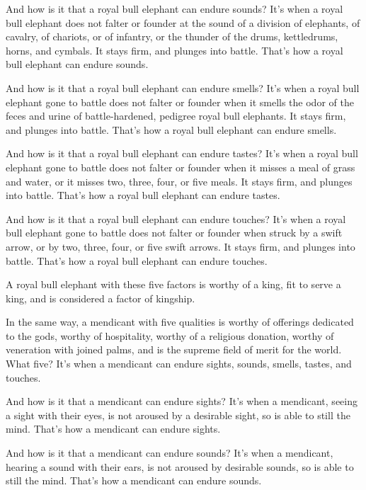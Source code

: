 \documentclass[12pt,openany]{book}%
\begin{document}
And how is it that a royal bull elephant can endure sounds? It’s when a royal bull elephant does not falter or founder at the sound of a division of elephants, of cavalry, of chariots, or of infantry, or the thunder of the drums, kettledrums, horns, and cymbals. It stays firm, and plunges into battle. That’s how a royal bull elephant can endure sounds. 

And how is it that a royal bull elephant can endure smells? It’s when a royal bull elephant gone to battle does not falter or founder when it smells the odor of the feces and urine of battle-hardened, pedigree royal bull elephants. It stays firm, and plunges into battle. That’s how a royal bull elephant can endure smells. 

And how is it that a royal bull elephant can endure tastes? It’s when a royal bull elephant gone to battle does not falter or founder when it misses a meal of grass and water, or it misses two, three, four, or five meals. It stays firm, and plunges into battle. That’s how a royal bull elephant can endure tastes. 

And how is it that a royal bull elephant can endure touches? It’s when a royal bull elephant gone to battle does not falter or founder when struck by a swift arrow, or by two, three, four, or five swift arrows. It stays firm, and plunges into battle. That’s how a royal bull elephant can endure touches. 

A royal bull elephant with these five factors is worthy of a king, fit to serve a king, and is considered a factor of kingship. 

In the same way, a mendicant with five qualities is worthy of offerings dedicated to the gods, worthy of hospitality, worthy of a religious donation, worthy of veneration with joined palms, and is the supreme field of merit for the world. What five? It’s when a mendicant can endure sights, sounds, smells, tastes, and touches. 

And how is it that a mendicant can endure sights? It’s when a mendicant, seeing a sight with their eyes, is not aroused by a desirable sight, so is able to still the mind. That’s how a mendicant can endure sights. 

And how is it that a mendicant can endure sounds? It’s when a mendicant, hearing a sound with their ears, is not aroused by desirable sounds, so is able to still the mind. That’s how a mendicant can endure sounds. 
\end{document}

